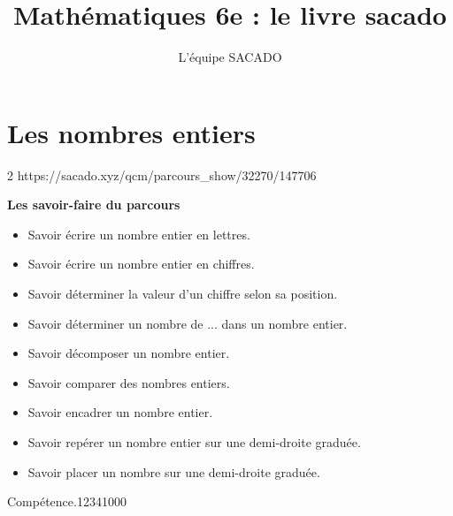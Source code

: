 



\title{Mathématiques 6e  : le livre sacado}
\author{L'équipe SACADO}

\usepackage{multido}




\chapter{Les nombres entiers}{2} %
{https://sacado.xyz/qcm/parcours_show/32270/147706}
{
 \begin{CpsCol}
	\textbf{Les savoir-faire du parcours}
 	\begin{itemize}
 		\item Savoir écrire un nombre entier en lettres.
		\item Savoir écrire un nombre entier en chiffres.
		\item Savoir déterminer la valeur d'un chiffre selon sa position.
		\item Savoir déterminer un nombre de ... dans un nombre entier.
		\item Savoir décomposer un nombre entier.
		\item Savoir comparer des nombres entiers.
		\item Savoir encadrer un nombre entier.
		\item Savoir repérer un nombre entier sur une demi-droite graduée.
		\item Savoir placer un nombre sur une demi-droite graduée.
 	\end{itemize}
 \end{CpsCol}

\begin{His}
\end{His}

\begin{ExoDec}{Compétence.}{1234}{1}{0}{0}{0}
\end{ExoDec}
}


